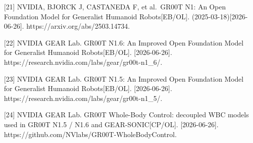 \documentclass[
  chinese,
]{ctexart}
\begin{document}
{[}21{]} NVIDIA, BJORCK J, CASTANEDA F, et al.~GR00T N1: An Open
Foundation Model for Generalist Humanoid Robots{[}EB/OL{]}.
(2025-03-18){[}2026-06-26{]}. https://arxiv.org/abs/2503.14734.

{[}22{]} NVIDIA GEAR Lab. GR00T N1.6: An Improved Open Foundation Model
for Generalist Humanoid Robots{[}EB/OL{]}. {[}2026-06-26{]}.
https://research.nvidia.com/labs/gear/gr00t-n1\_6/.

{[}23{]} NVIDIA GEAR Lab. GR00T N1.5: An Improved Open Foundation Model
for Generalist Humanoid Robots{[}EB/OL{]}. {[}2026-06-26{]}.
https://research.nvidia.com/labs/gear/gr00t-n1\_5/.

{[}24{]} NVIDIA GEAR Lab. GR00T Whole-Body Control: decoupled WBC models
used in GR00T N1.5 / N1.6 and GEAR-SONIC{[}CP/OL{]}. {[}2026-06-26{]}.
https://github.com/NVlabs/GR00T-WholeBodyControl.
\end{document}
